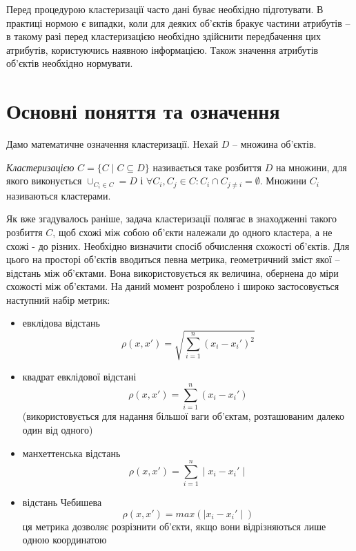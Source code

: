     Перед процедурою кластеризації часто дані буває необхідно підготувати. В практиці нормою є випадки, коли для деяких об'єктів бракує частини атрибутів -- в такому разі перед кластеризацією необхідно здійснити передбачення цих атрибутів, користуючись наявною інформацією. Також значення атрибутів об'єктів необхідно нормувати.

\section{Основні поняття та означення}
    Дамо математичне означення кластеризації. Нехай $D$ -- множина об'єктів. 
    \begin{definition}
        \emph{Кластеризацією} $C = \{C \mid C \subseteq D\}$ називається таке розбиття $D$ на множини, 
        для якого виконується $\cup_{C_i \in C} = D$ і $\forall C_i, C_j \in C : C_i \cap C_{j \neq i} = \emptyset$. 
        Множини $C_i$ називаються кластерами.
    \end{definition}
    Як вже згадувалось раніше, задача кластеризації полягає в знаходженні такого розбиття $C$, щоб схожі між собою об'єкти належали до одного кластера, а не схожі - до різних. Необхідно визначити спосіб обчислення схожості об'єктів.
    Для цього на просторі об'єктів вводиться певна метрика, геометричний зміст якої -- відстань між об'єктами. Вона використовується як величина, обернена до міри схожості між об'єктами. На даний момент розроблено і широко застосовується наступний набір метрик:
    \begin{itemize}
        \item {евклідова відстань} 
            \[ 
                \rho(x, x') = \sqrt{ \sum_{i=1}^n (x_i - x_i')^2}
            \]
        \item {квадрат евклідової відстані} 
            \[
                \rho(x, x') = \sum_{i=1}^n (x_i - x_i')
            \]            
            (використовується для надання більшої ваги об'єктам, розташованим далеко один від одного)
        \item {манхеттенська відстань} 
            \[
                \rho(x, x') = \sum_{i=1}^n \mid x_i - x_i' \mid
            \]
        \item {відстань Чебишева}
            \[
                \rho(x, x') = max(\mid x_i - x_i' \mid )
            \]            
            ця метрика дозволяє розрізнити об'єкти, якщо вони відрізняються лише одною координатою
    \end{itemize}
    
